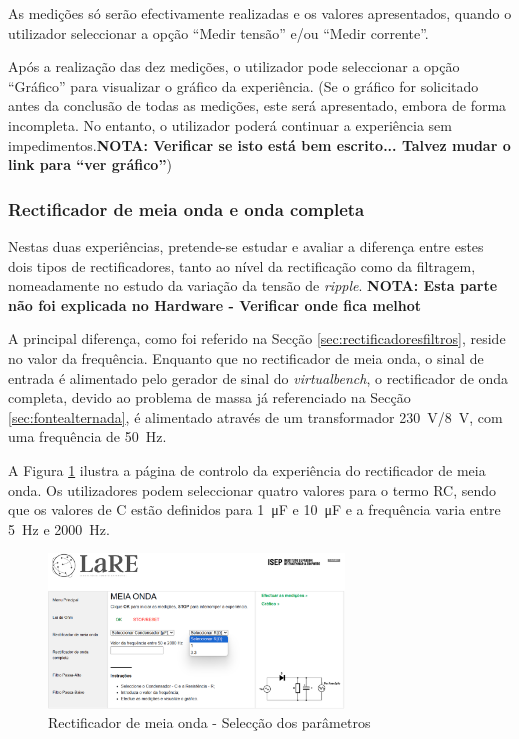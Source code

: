 As medições só serão efectivamente realizadas e os valores apresentados, quando o utilizador seleccionar a opção ``Medir tensão'' e/ou ``Medir corrente''. 

Após a realização das dez medições, o utilizador pode seleccionar a opção ``Gráfico'' para visualizar o gráfico da experiência. (Se o gráfico for solicitado antes da conclusão de todas as medições, este será apresentado, embora de forma incompleta. No entanto, o utilizador poderá continuar a experiência sem impedimentos.\textbf{NOTA: Verificar se isto está bem escrito... Talvez mudar o link para ``ver gráfico''})

\subsubsection{Rectificador de meia onda e onda completa}
\label{sec:rectificadores}
Nestas duas experiências, pretende-se estudar e avaliar a diferença entre estes dois tipos de rectificadores, tanto ao nível da rectificação como da filtragem, nomeadamente no estudo da variação da tensão de \textit{ripple}. \textbf{NOTA: Esta parte não foi explicada no Hardware - Verificar onde fica melhot} 

A principal diferença, como foi referido na Secção \ref{sec:rectificadoresfiltros}, reside no valor da frequência. Enquanto que no rectificador de meia onda, o sinal de entrada é alimentado pelo gerador de sinal do \textit{virtualbench}, o rectificador de onda completa, devido ao problema de massa já referenciado na Secção \ref{sec:fontealternada}, é alimentado através de um transformador \SI{230}{\volt}/\SI{8}{\volt}, com uma frequência de \SI{50}{\hertz}.

A Figura \ref{fig:meiaondamenuCTRL} ilustra a página de controlo da experiência do rectificador de meia onda. Os utilizadores podem seleccionar quatro valores para o termo RC, sendo que os valores de C estão definidos para \SI{1}{\micro\farad} e \SI{10}{\micro\farad} e a frequência varia entre \SI{5}{\hertz} e \SI{2000}{\hertz}. 

\begin{figure}[hbtp]
	\centering
	\includegraphics[width=0.7\textwidth]{figures/meiaonda_page_controlo.png}
	\caption{Rectificador de meia onda - Selecção dos parâmetros}
	\label{fig:meiaondamenuCTRL}
\end{figure}

